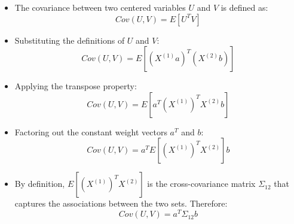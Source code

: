 \begin{itemize}
    \item The covariance between two centered variables $U$ and $V$ is defined as:
    \begin{equation}
        Cov(U, V) = E[U^T V]
    \end{equation}
    \item Substituting the definitions of $U$ and $V$:
    \begin{equation}
        Cov(U, V) = E[(X^{(1)}a)^T (X^{(2)}b)]
    \end{equation}
    \item Applying the transpose property:
    \begin{equation}
        Cov(U, V) = E[a^T (X^{(1)})^T X^{(2)} b]
    \end{equation}
    \item Factoring out the constant weight vectors $a^T$ and $b$:
    \begin{equation}
        Cov(U, V) = a^T E[(X^{(1)})^T X^{(2)}] b
    \end{equation}
    \item By definition, $E[(X^{(1)})^T X^{(2)}]$ is the cross-covariance matrix $\Sigma_{12}$ that captures the associations between the two sets. Therefore:
    \begin{equation}
        Cov(U, V) = a^T \Sigma_{12} b
    \end{equation}
\end{itemize}